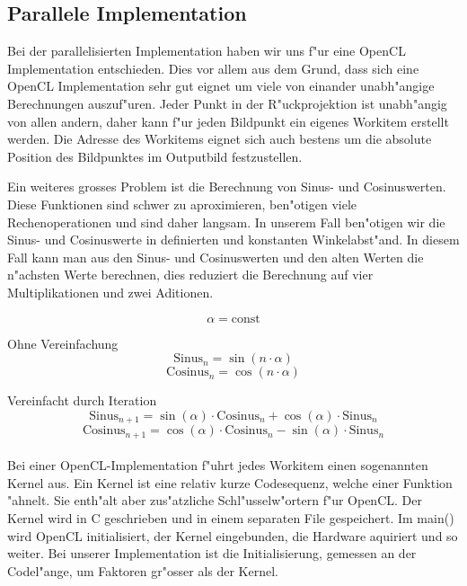 \subsection{Parallele Implementation}

Bei der parallelisierten Implementation haben wir uns f"ur eine
OpenCL Implementation entschieden. Dies vor allem aus dem Grund, dass
sich eine OpenCL Implementation sehr gut eignet um viele von einander
unabh"angige Berechnungen auszuf"uren. Jeder Punkt in der R"uckprojektion
ist unabh"angig von allen andern, daher kann f"ur jeden Bildpunkt ein
eigenes Workitem erstellt werden. Die Adresse des Workitems eignet sich
auch bestens um die absolute Position des Bildpunktes im Outputbild
festzustellen.

Ein weiteres grosses Problem ist die Berechnung von Sinus-
und Cosinuswerten. Diese Funktionen sind schwer zu aproximieren,
ben"otigen viele Rechenoperationen und sind daher langsam. In unserem
Fall ben"otigen wir die Sinus- und Cosinuswerte in definierten und
konstanten Winkelabst"and. In diesem Fall kann man aus den Sinus- und
Cosinuswerten und den alten Werten die n"achsten Werte berechnen, dies
reduziert die Berechnung auf vier Multiplikationen und zwei Aditionen.

\begin{equation}
	\alpha = \text{const}
\end{equation}

Ohne Vereinfachung\\
\begin{equation}
	\text{Sinus}_n = \sin(n\cdot\alpha) 
\end{equation}
\begin{equation}
	\text{Cosinus}_n = \cos(n\cdot\alpha)
\end{equation}

Vereinfacht durch Iteration\\
\begin{equation}
	\text{Sinus}_{n+1} = \sin(\alpha)\cdot \text{Cosinus}_n + \cos(\alpha)\cdot \text{Sinus}_n
\end{equation}
\begin{equation}
	\text{Cosinus}_{n+1} = \cos(\alpha)\cdot \text{Cosinus}_n - \sin(\alpha)\cdot \text{Sinus}_n
\end{equation} \\


Bei einer OpenCL-Implementation f"uhrt jedes Workitem einen sogenannten
Kernel aus. Ein Kernel ist eine relativ kurze Codesequenz, welche einer
Funktion "ahnelt. Sie enth"alt aber zus"atzliche Schl"usselw"ortern f"ur
OpenCL. Der Kernel wird in C geschrieben und in einem separaten File
gespeichert. Im main() wird OpenCL initialisiert, der Kernel eingebunden,
die Hardware aquiriert und so weiter. Bei unserer Implementation ist
die Initialisierung, gemessen an der Codel"ange, um Faktoren gr"osser
als der Kernel.

